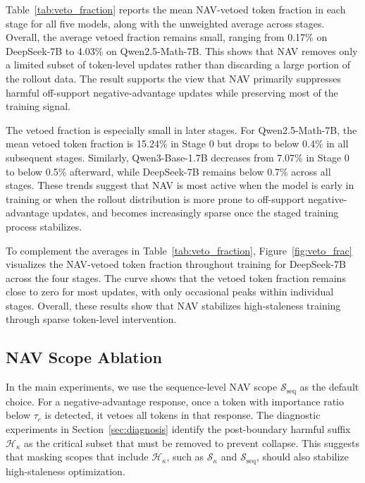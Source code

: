 Table~\ref{tab:veto_fraction} reports the mean NAV-vetoed token fraction in each stage for all five models, along with the unweighted average across stages. Overall, the average vetoed fraction remains small, ranging from 0.17\% on DeepSeek-7B to 4.03\% on Qwen2.5-Math-7B. This shows that NAV removes only a limited subset of token-level updates rather than discarding a large portion of the rollout data. The result supports the view that NAV primarily suppresses harmful off-support negative-advantage updates while preserving most of the training signal.  

The vetoed fraction is especially small in later stages. For Qwen2.5-Math-7B, the mean vetoed token fraction is 15.24\% in Stage 0 but drops to below 0.4\% in all subsequent stages. Similarly, Qwen3-Base-1.7B decreases from 7.07\% in Stage 0 to below 0.5\% afterward, while DeepSeek-7B remains below 0.7\% across all stages. These trends suggest that NAV is most active when the model is early in training or when the rollout distribution is more prone to off-support negative-advantage updates, and becomes increasingly sparse once the staged training process stabilizes.



To complement the averages in Table~\ref{tab:veto_fraction},
Figure~\ref{fig:veto_frac} visualizes the NAV-vetoed token fraction throughout
training for DeepSeek-7B across the four stages. The curve shows that the vetoed
token fraction remains close to zero for most updates, with only occasional peaks
within individual stages. Overall, these results show that NAV stabilizes high-staleness training through sparse token-level intervention.

\subsection{NAV Scope Ablation}
\label{app:nav_scope_ablation}

In the main experiments, we use the sequence-level NAV scope $\mathcal S_{\mathrm{seq}}$ as the default choice. For a negative-advantage response, once a token with importance ratio below $\tau_c$ is detected, it vetoes all tokens in that response. The diagnostic experiments in Section~\ref{sec:diagnosis} identify the post-boundary harmful suffix $\mathcal H_\kappa$ as the critical subset that must be removed to prevent collapse. This suggests that masking scopes that include $\mathcal H_\kappa$, such as $\mathcal S_{\kappa}$ and $\mathcal S_{\mathrm{seq}}$, should also stabilize high-staleness optimization.


